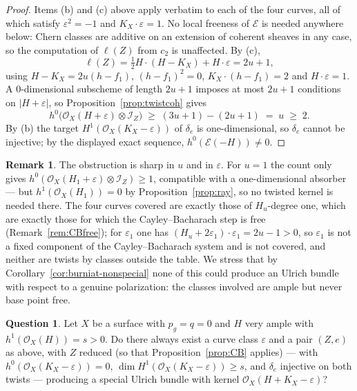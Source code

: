 \documentclass{amsart}
\theoremstyle{definition}
\newtheorem{remark}[theorem]{Remark}
\newtheorem{question}[theorem]{Question}
\newcommand{\OO}{\mathcal{O}}
\newcommand{\EE}{\mathcal{E}}
\newcommand{\II}{\mathcal{I}}
\newcommand{\len}{\ell}
\begin{document}
\begin{proof}
Items (b) and (c) above apply verbatim to each of the four curves, all of which satisfy $\varepsilon^2=-1$ and $K_X\cdot\varepsilon=1$. No local freeness of $\EE$ is needed anywhere below: Chern classes are additive on an extension of coherent sheaves in any case, so the computation of $\len(Z)$ from $c_2$ is unaffected. By (c),
\[
\len(Z)=\tfrac12H\cdot(H-K_X)+H\cdot\varepsilon=2u+1 ,
\]
using $H-K_X=2u(h-f_1)$, $(h-f_1)^2=0$, $K_X\cdot(h-f_1)=2$ and $H\cdot\varepsilon=1$. A $0$-dimensional subscheme of length $2u+1$ imposes at most $2u+1$ conditions on $|H+\varepsilon|$, so Proposition~\ref{prop:twistcoh} gives
\[
h^0\bigl(\OO_X(H+\varepsilon)\otimes\II_Z\bigr)\;\ge\;(3u+1)-(2u+1)\;=\;u\;\ge\;2 .
\]
By (b) the target $H^1(\OO_X(K_X-\varepsilon))$ of $\delta_e$ is one-dimensional, so $\delta_e$ cannot be injective; by the displayed exact sequence, $h^0(\EE(-H))\neq0$.
\end{proof}

\begin{remark}\label{rem:twistedfail-scope}
The obstruction is sharp in $u$ and in $\varepsilon$. For $u=1$ the count only gives $h^0(\OO_X(H_1+\varepsilon)\otimes\II_Z)\ge1$, compatible with a one-dimensional absorber --- but $h^1(\OO_X(H_1))=0$ by Proposition~\ref{prop:ray}, so no twisted kernel is needed there. The four curves covered are exactly those of $H_u$-degree one, which are exactly those for which the Cayley--Bacharach step is free (Remark~\ref{rem:CBfree}); for $\varepsilon_1$ one has $(H_u+2\varepsilon_1)\cdot\varepsilon_1=2u-1>0$, so $\varepsilon_1$ is not a fixed component of the Cayley--Bacharach system and is not covered, and neither are twists by classes outside the table. We stress that by Corollary~\ref{cor:burniat-nonspecial} none of this could produce an Ulrich bundle with respect to a genuine polarization: the classes involved are ample but never base point free.
\end{remark}

\begin{question}\label{q:twisted}
Let $X$ be a surface with $p_g=q=0$ and $H$ very ample with $h^1(\OO_X(H))=s>0$. Do there always exist a curve class $\varepsilon$ and a pair $(Z,e)$ as above, with $Z$ reduced (so that Proposition~\ref{prop:CB} applies) --- with $h^0(\OO_X(K_X-\varepsilon))=0$, $\dim H^1(\OO_X(K_X-\varepsilon))\ge s$, and $\delta_e$ injective on both twists --- producing a special Ulrich bundle with kernel $\OO_X(H+K_X-\varepsilon)$?
\end{question}
\end{document}
